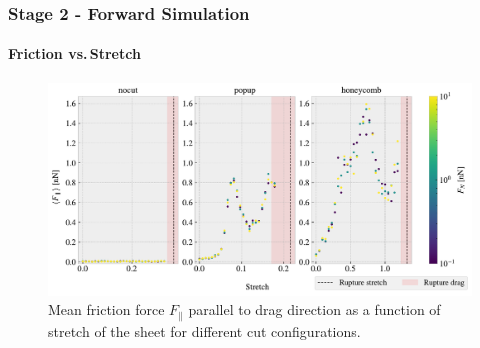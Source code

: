 \documentclass[
	10pt, %
]{beamer}
\begin{document}
\begin{frame}
	\frametitle{Stage 2 - Forward Simulation}
	\framesubtitle{Friction vs.\,Stretch}
	\begin{figure}
		\includegraphics[height=0.65\textheight]{figures/multi_stretch_mean_compare.pdf}
		\caption{Mean friction force $F_{\parallel}$ parallel to drag direction as a function of stretch of the sheet for different cut configurations.}
	\end{figure}	
\end{frame}
\end{document}
